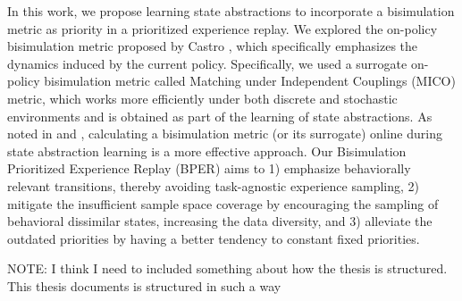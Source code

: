 In this work, we propose learning state abstractions to incorporate a bisimulation metric as priority in a prioritized experience replay. We explored the on-policy bisimulation metric proposed by Castro \cite{castro2020scalable}, which specifically emphasizes the dynamics induced by the current policy. Specifically, we used a surrogate on-policy bisimulation metric called Matching under Independent Couplings (MICO) \cite{castro2021mico} metric, which works more efficiently under both discrete and stochastic environments and is obtained as part of the learning of state abstractions. As noted in \cite{zhang2020learning} and \cite{castro2021mico}, calculating a bisimulation metric (or its surrogate) online during state abstraction learning is a more effective approach. Our Bisimulation Prioritized Experience Replay (BPER) aims to 1) emphasize behaviorally relevant transitions, thereby avoiding task-agnostic experience sampling, 2) mitigate the insufficient sample space coverage by encouraging the sampling of behavioral dissimilar states, increasing the data diversity, and 3) alleviate the outdated priorities by having a better tendency to constant fixed priorities.


NOTE: I think I need to included something about how the thesis is structured.
This thesis documents is structured in such a way 

